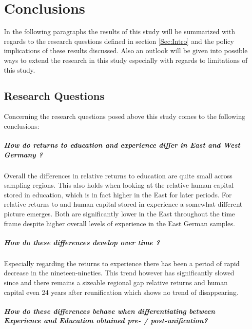 \section{Conclusions}\label{Sec:Conc}
In the following paragraphs the results of this study will be summarized with regards to the research questions defined in section \ref{Sec:Intro} and the policy implications of these results discussed. Also an outlook will be given into possible ways to extend the research in this study especially with regards to limitations of this study.
\subsection{Research Questions}
Concerning the research questions posed above this study comes to the following conclusions:
\subparagraph*{How do returns to education and experience differ in East and West Germany ?} Overall the differences in relative returns to education are quite small across sampling regions. This also holds when looking at the relative human capital stored in education, which is in fact higher in the East for later periods.  For relative returns to and human capital stored in experience a somewhat different picture emerges. Both are significantly lower in the East throughout the time frame despite higher overall levels of experience in the East German samples.
\subparagraph*{How do these differences develop over time ?}
	Especially regarding the returns to experience there has been a period of rapid decrease in the nineteen-nineties. This trend however has significantly slowed since and there remains a sizeable regional gap relative returns and human capital even 24 years after reunification which shows no trend of disappearing.  
\subparagraph*{How do these differences behave when differentiating between Experience and Education obtained pre- / post-unification?}
